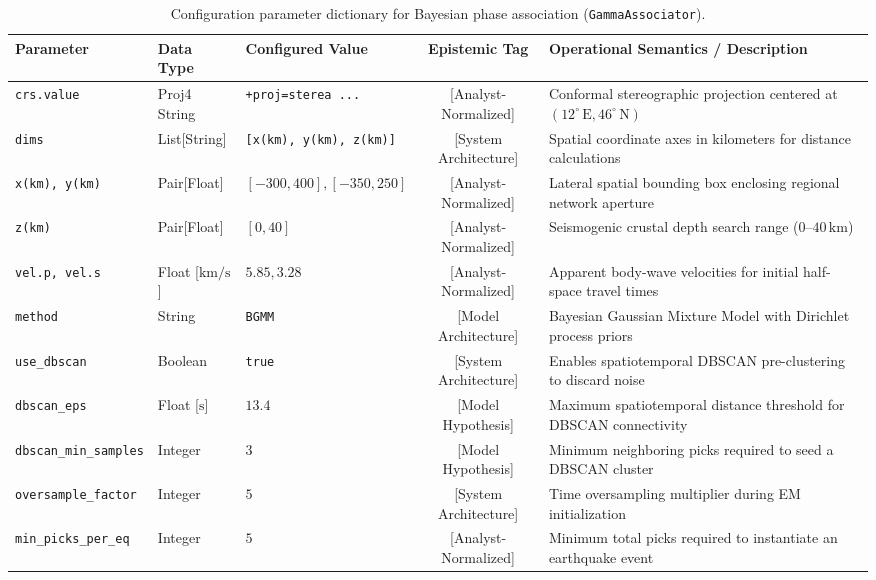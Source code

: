 \begin{table}[htbp]
  \centering
  \small
  \caption{Configuration parameter dictionary for Bayesian phase association (\texttt{GammaAssociator}).}
  \label{tab:app_gamma_dictionary}
  \begin{threeparttable}
    \begin{tabularx}{\linewidth}{l l l c X}
      \toprule
      \textbf{Parameter} & \textbf{Data Type} & \textbf{Configured Value} & \textbf{Epistemic Tag} & \textbf{Operational Semantics / Description} \\
      \midrule
      \texttt{crs.value} & Proj4 String & \texttt{+proj=sterea ...} & [Analyst-Normalized] & Conformal stereographic projection centered at $(12^\circ\,\mathrm{E}, 46^\circ\,\mathrm{N})$ \\
      \texttt{dims} & List[String] & \texttt{[x(km), y(km), z(km)]} & [System Architecture] & Spatial coordinate axes in kilometers for distance calculations \\
      \texttt{x(km), y(km)} & Pair[Float] & $[-300, 400], [-350, 250]$ & [Analyst-Normalized] & Lateral spatial bounding box enclosing regional network aperture \\
      \texttt{z(km)} & Pair[Float] & $[0, 40]$ & [Analyst-Normalized] & Seismogenic crustal depth search range ($0\text{--}40\,\unit{\kilo\meter}$) \\
      \texttt{vel.p, vel.s} & Float [$\unit{\kilo\meter/\second}$] & $5.85, 3.28$ & [Analyst-Normalized] & Apparent body-wave velocities for initial half-space travel times \\
      \texttt{method} & String & \texttt{BGMM} & [Model Architecture] & Bayesian Gaussian Mixture Model with Dirichlet process priors \\
      \texttt{use\_dbscan} & Boolean & \texttt{true} & [System Architecture] & Enables spatiotemporal DBSCAN pre-clustering to discard noise \\
      \texttt{dbscan\_eps} & Float [$\unit{\second}$] & $13.4$ & [Model Hypothesis] & Maximum spatiotemporal distance threshold for DBSCAN connectivity \\
      \texttt{dbscan\_min\_samples} & Integer & $3$ & [Model Hypothesis] & Minimum neighboring picks required to seed a DBSCAN cluster \\
      \texttt{oversample\_factor} & Integer & $5$ & [System Architecture] & Time oversampling multiplier during EM initialization \\
      \texttt{min\_picks\_per\_eq} & Integer & $5$ & [Analyst-Normalized] & Minimum total picks required to instantiate an earthquake event \\

\end{tabularx}
\end{threeparttable}
\end{table}
